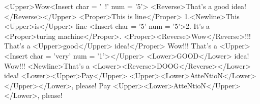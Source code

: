 <Upper>Wow<Insert char = '~!' num = '5'> <Reverse>That's a good idea!</Reverse></Upper>
<Proper>This is line</Proper> 1.<Newline>This <Upper>is</Upper> line <Insert char = '5' num = '5'>2.
It's a <Proper>turing machine</Proper>.
<Proper><Reverse>Wow</Reverse>!!! That's a <Upper>good</Upper> idea!</Proper>
Wow!!! That's a <Upper><Insert char = 'very' num = '1'></Upper> <Lower>GOOD</Lower> idea!
Wow!!! <Newline>That's a <Lower><Reverse>DOOG</Reverse></Lower> idea!
<Lower><Upper>Pay</Upper> <Upper><Lower>AtteNtioN</Lower></Upper></Lower>, please!
Pay <Upper><Lower>AtteNtioN</Upper></Lower>, please!
